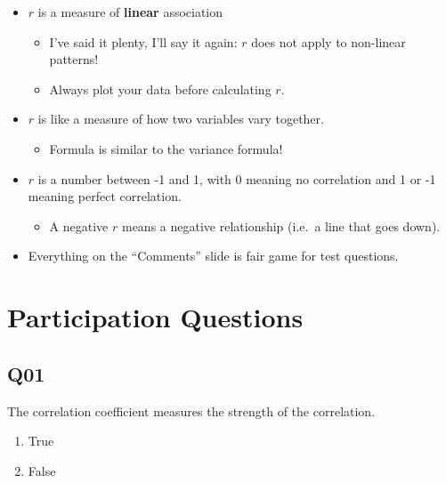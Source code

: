 \documentclass[
  letterpaper,
  DIV=11,
  numbers=noendperiod]{scrreprt}
\providecommand{\tightlist}{%
  \setlength{\itemsep}{0pt}\setlength{\parskip}{0pt}}\usepackage{longtable,booktabs,array}
\begin{document}
\begin{itemize}
\tightlist
\item
  \(r\) is a measure of \textbf{linear} association

  \begin{itemize}
  \tightlist
  \item
    I've said it plenty, I'll say it again: \(r\) does not apply to
    non-linear patterns!
  \item
    Always plot your data before calculating \(r\).\lspace
  \end{itemize}
\item
  \(r\) is like a measure of how two variables vary together.

  \begin{itemize}
  \tightlist
  \item
    Formula is similar to the variance formula!\lspace
  \end{itemize}
\item
  \(r\) is a number between -1 and 1, with 0 meaning no correlation and
  1 or -1 meaning perfect correlation.

  \begin{itemize}
  \tightlist
  \item
    A negative \(r\) means a negative relationship (i.e.~a line that
    goes down).\lspace
  \end{itemize}
\item
  Everything on the ``Comments'' slide is fair game for test questions.
\end{itemize}

\hypertarget{participation-questions}{%
\chapter{Participation Questions}\label{participation-questions}}

\hypertarget{q01}{%
\section{Q01}\label{q01}}

The correlation coefficient measures the strength of the correlation.

\begin{enumerate}
\def\labelenumi{\arabic{enumi}.}
\tightlist
\item
  True
\item
  False
\end{enumerate}
\end{document}
